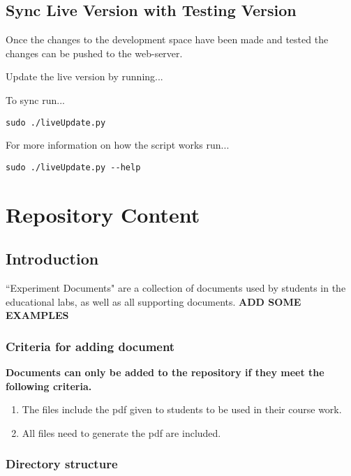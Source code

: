 \documentclass[justified]{LabArx3_5_1}
\begin{document}
\section{Sync Live Version with Testing Version}\label{sec:finalsync}

Once the changes to the development space have been made and tested the changes can be pushed to the web-server. 

Update the live version by running...

\noindent To sync run...
\begin{lstlisting}[backgroundcolor = \color{light-gray}]
sudo ./liveUpdate.py
\end{lstlisting}
\vspace{-1em}
\noindent For more information on how the script works run...

\begin{lstlisting}[backgroundcolor = \color{light-gray}]
sudo ./liveUpdate.py --help
\end{lstlisting}

\chapter{Repository Content}\label{chap:expDocs}

\section{Introduction}

``Experiment Documents" are a collection of documents used by students in the educational labs, as well as all supporting documents. {\bf ADD SOME EXAMPLES} \\

\subsection{Criteria for adding document}

{\bf Documents can only be added to the repository if they meet the following criteria.}
\begin{enumerate}
\item The files include the pdf given to students to be used in their course work.
\item All files need to generate the pdf are included.
\end{enumerate}

\subsection{Directory structure}
\end{document}
